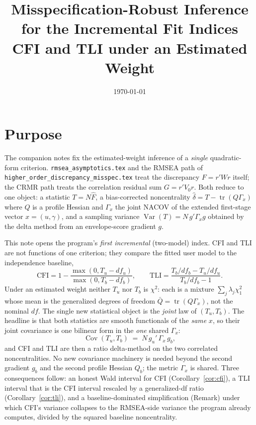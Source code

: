 \documentclass[11pt]{article}
\title{Misspecification-Robust Inference for the Incremental Fit Indices\\
CFI and TLI under an Estimated Weight}
\author{}
\date{\today}
\newcommand{\tr}{\operatorname{tr}}
\newcommand{\Var}{\operatorname{Var}}
\newcommand{\Cov}{\operatorname{Cov}}
\theoremstyle{plain}
\theoremstyle{remark}
\begin{document}
\maketitle

\section*{Purpose}

The companion notes fix the estimated-weight inference of a \emph{single}
quadratic-form criterion. \texttt{rmsea\_asymptotics.tex} and the RMSEA path of
\texttt{higher\_order\_discrepancy\_misspec.tex} treat the discrepancy
$F=r'Wr$ itself; the CRMR path treats the correlation residual sum $G=r'V_0r$.
Both reduce to one object: a statistic $T=N\hat F$, a bias-corrected
noncentrality $\hat\delta=T-\tr(Q\Gamma_x)$ where $Q$ is a profile Hessian and
$\Gamma_x$ the joint NACOV of the extended first-stage vector
$x=(u,\gamma)$, and a sampling variance $\Var(T)=N\,g'\Gamma_x g$ obtained by
the delta method from an envelope-score gradient $g$.

This note opens the program's \emph{first incremental} (two-model) index. CFI
and TLI are not functions of one criterion; they compare the fitted user model
to the independence baseline,
\begin{equation}\label{eq:cfi-tli-classical}
  \mathrm{CFI}=1-\frac{\max(0,T_u-df_u)}{\max(0,T_b-df_b)},\qquad
  \mathrm{TLI}=\frac{T_b/df_b-T_u/df_u}{T_b/df_b-1}.
\end{equation}
Under an estimated weight neither $T_u$ nor $T_b$ is $\chi^2$: each is a
mixture $\sum_j\lambda_j\chi^2_1$ whose mean is the generalized degrees of
freedom $\bar Q=\tr(Q\Gamma_x)$, not the nominal $df$. The single new
statistical object is the \emph{joint} law of $(T_u,T_b)$. The headline is that
both statistics are smooth functionals of the \emph{same} $x$, so their joint
covariance is one bilinear form in the \emph{one} shared $\Gamma_x$:
\begin{equation}\label{eq:headline}
  \Cov(T_u,T_b)\;=\;N\,g_u'\,\Gamma_x\,g_b,
\end{equation}
and CFI and TLI are then a ratio delta-method on the two correlated
noncentralities. No new covariance machinery is needed beyond the second
gradient $g_b$ and the second profile Hessian $Q_b$; the metric $\Gamma_x$ is
shared. Three consequences follow: an honest Wald interval for CFI
(Corollary~\ref{cor:cfi}), a TLI interval that is the CFI interval rescaled by a
generalized-df ratio (Corollary~\ref{cor:tli}), and a baseline-dominated
simplification (Remark) under which CFI's variance collapses to the
RMSEA-side variance the program already computes, divided by the squared
baseline noncentrality.
\end{document}
